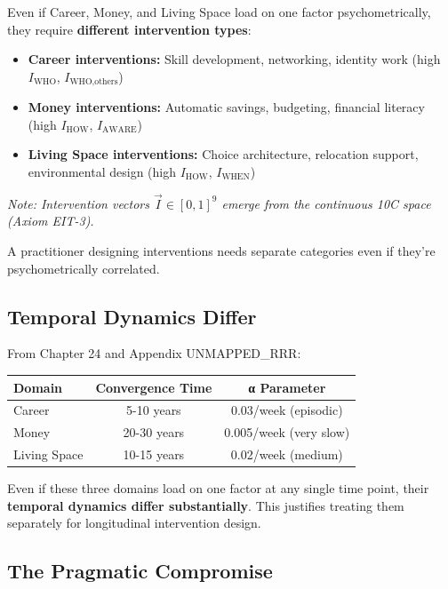 \begin{tcolorbox}[colback=green!5!white, colframe=green!75!black, title=Practitioner Argument]
Even if Career, Money, and Living Space load on one factor psychometrically, they require \textbf{different intervention types}:

\begin{itemize}[nosep]
\item \textbf{Career interventions:} Skill development, networking, identity work (high $I_{\text{WHO}}$, $I_{\text{WHO},\text{others}}$)
\item \textbf{Money interventions:} Automatic savings, budgeting, financial literacy (high $I_{\text{HOW}}$, $I_{\text{AWARE}}$)
\item \textbf{Living Space interventions:} Choice architecture, relocation support, environmental design (high $I_{\text{HOW}}$, $I_{\text{WHEN}}$)
\end{itemize}
\noindent\textit{Note: Intervention vectors $\vec{I} \in [0,1]^9$ emerge from the continuous 10C space (Axiom EIT-3).}

A practitioner designing interventions needs separate categories even if they're psychometrically correlated.
\end{tcolorbox}

\subsection{Temporal Dynamics Differ}

From Chapter 24 and Appendix UNMAPPED_RRR:

\begin{center}
\begin{tabular}{@{}lcc@{}}
\toprule
\textbf{Domain} & \textbf{Convergence Time} & \textbf{α Parameter} \\
\midrule
Career & 5-10 years & 0.03/week (episodic) \\
Money & 20-30 years & 0.005/week (very slow) \\
Living Space & 10-15 years & 0.02/week (medium) \\
\bottomrule
\end{tabular}
\end{center}

Even if these three domains load on one factor at any single time point, their \textbf{temporal dynamics differ substantially}. This justifies treating them separately for longitudinal intervention design.

\subsection{The Pragmatic Compromise}

